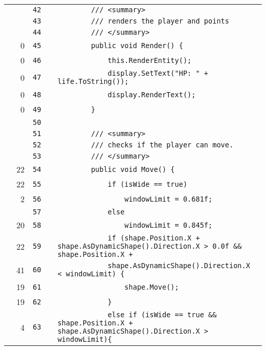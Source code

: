 \documentclass[a4paper,landscape,10pt]{article}
\begin{document}
\begin{longtable}[l]{lrrll}
\cellcolor{gray} &  & \verb~42~ & & \verb~        /// <summary>~\\
\cellcolor{gray} &  & \verb~43~ & & \verb~        /// renders the player and points~\\
\cellcolor{gray} &  & \verb~44~ & & \verb~        /// </summary>~\\
\cellcolor{red} & 0 & \verb~45~ & & \verb~        public void Render() {~\\
\cellcolor{red} & 0 & \verb~46~ & & \verb~            this.RenderEntity();~\\
\cellcolor{red} & 0 & \verb~47~ & & \verb~            display.SetText("HP: " + life.ToString());~\\
\cellcolor{red} & 0 & \verb~48~ & & \verb~            display.RenderText();~\\
\cellcolor{red} & 0 & \verb~49~ & & \verb~        }~\\
\cellcolor{gray} &  & \verb~50~ & & \verb~~\\
\cellcolor{gray} &  & \verb~51~ & & \verb~        /// <summary>~\\
\cellcolor{gray} &  & \verb~52~ & & \verb~        /// checks if the player can move.~\\
\cellcolor{gray} &  & \verb~53~ & & \verb~        /// </summary>~\\
\cellcolor{green} & 22 & \verb~54~ & & \verb~        public void Move() {~\\
\cellcolor{green} & 22 & \verb~55~ & & \verb~            if (isWide == true)~\\
\cellcolor{green} & 2 & \verb~56~ & & \verb~                windowLimit = 0.681f;~\\
\cellcolor{gray} &  & \verb~57~ & & \verb~            else~\\
\cellcolor{green} & 20 & \verb~58~ & & \verb~                windowLimit = 0.845f;~\\
\cellcolor{orange} & 22 & \verb~59~ & & \verb~            if (shape.Position.X + shape.AsDynamicShape().Direction.X > 0.0f && shape.Position.X +~\\
\cellcolor{green} & 41 & \verb~60~ & & \verb~            shape.AsDynamicShape().Direction.X < windowLimit) {~\\
\cellcolor{green} & 19 & \verb~61~ & & \verb~                shape.Move();~\\
\cellcolor{green} & 19 & \verb~62~ & & \verb~            }~\\
\cellcolor{green} & 4 & \verb~63~ & & \verb~            else if (isWide == true && shape.Position.X + shape.AsDynamicShape().Direction.X > windowLimit){~\\

\end{longtable}
\end{document}
